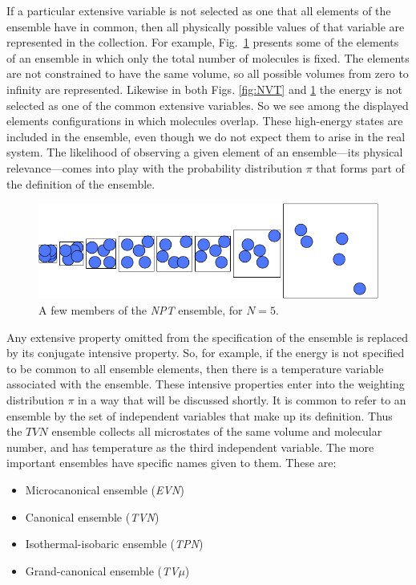 \documentclass[]{article}
\begin{document}
If a particular extensive variable is not selected as one that all
elements of the ensemble have in common, then all physically possible
values of that variable are represented in the collection. For example,
Fig.~\ref{fig:NPT} presents some of the elements of an ensemble in which
only the total number of molecules is fixed. The elements are not
constrained to have the same volume, so all possible volumes from zero
to infinity are represented. Likewise in both Figs. \ref{fig:NVT} and \ref{fig:NPT} the
energy is not selected as one of the common extensive variables. So we
see among the displayed elements configurations in which molecules
overlap. These high-energy states are included in the ensemble, even
though we do not expect them to arise in the real system. The likelihood
of observing a given element of an ensemble---its physical
relevance---comes into play with the probability distribution $\pi$ that
forms part of the definition of the ensemble.
\begin{figure}
\includegraphics[width=\textwidth]{image111}
\caption{\label{fig:NPT}A few members of the \emph{NPT} ensemble, for $N = 5$.}
\end{figure}


Any extensive property omitted from the specification of the ensemble is
replaced by its conjugate intensive property. So, for example, if the
energy is not specified to be common to all ensemble elements, then
there is a temperature variable associated with the ensemble. These
intensive properties enter into the weighting distribution $\pi$ in a way
that will be discussed shortly. It is common to refer to an ensemble by
the set of independent variables that make up its definition. Thus the
$TVN$ ensemble collects all microstates of the same volume and molecular
number, and has temperature as the third independent variable. The more
important ensembles have specific names given to them. These are:

\begin{itemize}
\item
  Microcanonical ensemble (\emph{EVN})
\item
  Canonical ensemble (\emph{TVN})
\item
  Isothermal-isobaric ensemble (\emph{TPN})
\item
  Grand-canonical ensemble (\emph{TV$\mu$})
\end{itemize}
\end{document}
